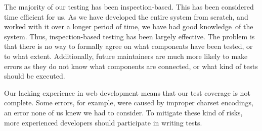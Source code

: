 The majority of our testing has been inspection-based. This has been
considered time efficient for us. As we have developed the entire
system from scratch, and worked with it over a longer period of time,
we have had good knowledge\ of the system. Thus, inspection-based
testing has been largely effective. The problem is that there is no way
to formally agree on what components have been tested, or to what
extent. Additionally, future maintainers are much more likely to make
errors as they do not know what components are connected, or what kind
of tests should be executed.

Our lacking experience in web development means that our test coverage
is not complete. Some errors, for example, were caused by improper
charset encodings, an error none of us knew we had to consider. To
mitigate these kind of risks, more experienced developers should
participate in writing tests.
